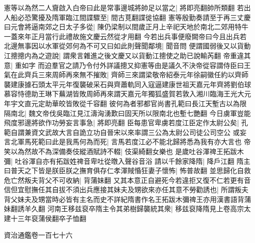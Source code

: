 憲等以為然二人齎啟入白帝曰此是常事邊城將帥足以當之|{
	將即亮翻帥所類翻}
若出人船必恐驚擾及隋軍臨江間諜驟至|{
	間古莧翻諜徙協翻}
憲等殷勤奏請至于再三丈慶曰元會將逼南郊之日太子多從|{
	陳仍梁制以間歲正月上辛祀天地於南北二郊用特牛一蓋來年正月當行此禮故施文慶云然從才用翻}
今若出兵事便廢闕帝曰今且出兵若北邊無事因以水軍從郊何為不可又曰如此則聲聞鄰境|{
	聞音問}
便謂國弱後又以貨動江摠摠内為之遊說|{
	謂衆言雜進之後文慶又以貨動江摠使之助已說輸芮翻}
帝重違其意|{
	重如字}
而迫羣官之請乃令付外詳議摠又抑憲等由是議久不決帝從容謂侍臣曰王氣在此齊兵三來周師再來無不摧敗|{
	齊師三來謂梁敬帝紹泰元年徐嗣徽任約以齊師襲建康據石頭太平元年復襲破采石與齊蕭軌同入寇逼建康世祖天嘉元年齊將劉伯球慕容恃德助王琳下蕪湖皆敗周師再來謂天嘉元年獨狐盛賀若敦入湘川臨海王光大元年宇文直元定助華皎皆敗從千容翻}
彼何為者邪都官尚書孔範曰長江天塹古以為限隔南北|{
	魏文帝伐吳臨江見江濤洶湧歎曰固天所以限南北也塹七艷翻}
今日虜軍豈能飛度邪邊將欲作功勞妄言事急|{
	將即亮翻}
臣每患官卑虜若度江臣定作太尉公矣|{
	孔範自謂兼資文武故大言自詭立功自晉宋以來率謂三公為太尉公司徒公司空公}
或妄言北軍馬死範曰此是我馬何為而死|{
	言馬若度江必不能北歸將悉為我有亦大言也}
帝笑以為然故不為深備奏伎縱酒賦詩不輟|{
	伎渠綺翻女樂也}
是歲吐谷渾禆王拓跋木彌|{
	吐谷渾自亦有拓跋姓禆音卑吐從暾入聲谷音浴}
請以千餘家降隋|{
	降戶江翻}
隋主曰普天之下皆是朕臣朕之撫育俱存仁孝渾賊惛狂妻子懷怖|{
	怖普故翻}
並思歸化自救危亡然叛夫背父不可收納|{
	背蒲妹翻}
又其本意正自避死今若違拒又復不仁若更有音信但宜慰撫任其自拔不須出兵應接其妹夫及甥欲來亦任其意不勞勸誘也|{
	所謂叛夫背父妹夫及甥當時必皆有主名而史不詳紀隋書作名王拓跋木彌禆王亦用漢書語背蒲妹翻誘羊久翻}
河南王移兹裒卒隋主令其弟樹歸襲統其衆|{
	移兹裒降隋見上卷高宗太建十三年裒蒲侯翻卒子恤翻}


資治通鑑卷一百七十六
